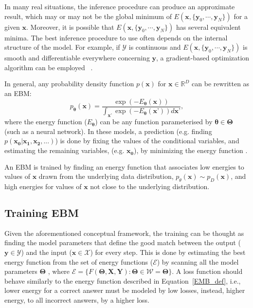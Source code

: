\documentclass[sn-mathphys-num]{sn-jnl}%
\newcommand{\tod}[1]{{\color{magenta}\textbf{***{#1}***}}}
\newcommand{\svec}[1]{\{\ensuremath{\vec{#1}_0, \cdots, \vec{#1}_N}\}}
\newcommand{\vtheta}{{\ensuremath{\boldsymbol{\theta}}}}
\renewcommand\vec{\mathbf}
\begin{document}
In many real situations, the inference procedure can produce an approximate result, which may or may not be the global minimum of $E(\vec{x}, \svec{y})$ for a given $\vec{x}$. Moreover, it is possible that $E(\vec{x}, \svec{y})$ has several equivalent minima. The best inference procedure to use often depends on the internal structure of the model. For example, if $\mathcal{Y}$ is continuous and $E(\vec{x}, \svec{y})$ is smooth and differentiable everywhere concerning $\vec{y}$, a gradient-based optimization algorithm can be employed ~\cite{bengio2000gradient}. 

In general, any probability density function $p(\vec{x})$ for $\vec{x}\in\mathbb{R}^D$ can be rewritten as an EBM:
\begin{equation}
\label{eq:ebm_basic}
 p_\vtheta(\vec{x}) = \frac{\exp(-E_\vtheta(\vec{x}))}{\int_{\vec{x}’} \exp(-E_\vtheta(\vec{x}’)) d\vec{x}’},
\end{equation}
where the energy function ($E_\vtheta$) can be any function parameterised by $\vtheta \in \vec{\Theta}$ (such as a  neural network). In these models, a prediction (e.g. finding $p(\vec{x_0}| \vec{x_1},\vec{x_2},...)$) is done by fixing the values of the conditional variables, and estimating the remaining variables, (e.g. $\vec{x_0}$), by minimizing the energy function \cite{teh2003energy,swersky2011autoencoders,zhai2016deep}. 

An EBM is trained by finding an energy function that associates low energies to values of $\vec{x}$ drawn from the underlying data distribution, $p_\theta(\vec{x})\sim p_D(\vec{x})$, and high energies for values of $\vec{x}$ not close to the underlying distribution.


\subsection{Training EBM}
Given the aforementioned conceptual framework, the training can be thought as finding the model parameters that define the good match between the output ($\vec{y}\in\mathcal{Y}$) and the input ($\vec{x}\in \mathcal{X}$) for every step. This is done by estimating the best energy function from the set of energy functions ($\mathcal{E}$) by scanning all the model parameters $\vec{\vec{\Theta}}$ \cite{kumar2019maximum,song2021train}, where $\mathcal{E} = \{F(\vec{\Theta},\vec{X},\vec{Y}): \vec{\Theta}\in\mathcal{W}=\vec{\Theta}\}$.
A loss function should behave similarly to the energy function described in Equation~\ref{EMB_def}, i.e., lower energy for a correct answer must be modeled by low losses, instead, higher energy, to all incorrect answers, by a higher loss.
\end{document}
